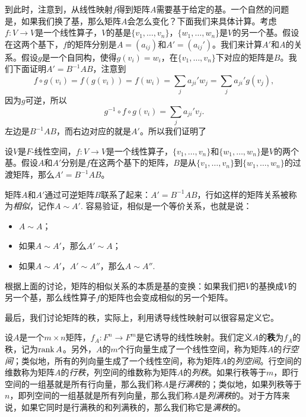 到此时，注意到，从线性映射$f$得到矩阵$A$需要基于给定的基。一个自然的问题是，如果我们换了基，那么矩阵$A$会怎么变化？下面我们来具体计算。考虑$f:V\to V$是一个线性算子，$V$的基是$\{v_1,\dots,v_n\}$，$\{w_1,\dots,w_n\}$是$V$的另一个基。假设在这两个基下，$f$的矩阵分别是$A=(a_{ij})$和$A'=(a_{ij}')$。我们来计算$A'$和$A$的关系。假设$g$是一个自同构，使得$g(v_i)=w_i$，在$\{v_1,\dots,v_n\}$下对应的矩阵是$B$。我们下面证明$A'=B^{-1}AB$，注意到
\[f\circ g(v_i)=f(g(v_i))=f(w_i)=\sum_{j}a_{ji}'w_j=\sum_{j}a_{ji}'g(v_j),\]
因为$g$可逆，所以
\[g^{-1}\circ f\circ g(v_i)=\sum_{j}a_{ji}'v_j.\]
左边是$B^{-1}AB$，而右边对应的就是$A'$。所以我们证明了

\begin{theorem}\label{thm:base-change}
    设$V$是$F$-线性空间，$f:V\to V$是一个线性算子，$\{v_1,\dots,v_n\}$和$\{w_1,\dots,w_n\}$是$V$的两个基。假设$A$和$A'$分别是$f$在这两个基下的矩阵，$B$是从$\{v_1,\dots,v_n\}$到$\{w_1,\dots,w_n\}$的过渡矩阵，那么$A'=B^{-1}AB$。
\end{theorem}

矩阵$A$和$A'$通过可逆矩阵$B$联系了起来：$A'=B^{-1}AB$，行如这样的矩阵关系被称为\emph{相似}，记作$A\sim A'$. 容易验证，相似是一个等价关系，也就是说：
\begin{itemize}
    \item $A\sim A$；
    \item 如果$A\sim A'$，那么$A'\sim A$；
    \item 如果$A\sim A'$，$A'\sim A''$，那么$A\sim A''$.
\end{itemize}
根据上面的讨论，矩阵的相似关系的本质是基的变换：如果我们把$V$的基换成$V$的另一个基，那么线性算子$f$的矩阵也会变成相似的另一个矩阵。

最后，我们讨论矩阵的秩，实际上，利用诱导线性映射可以很容易定义它。

\begin{definition}[矩阵的秩]
    设$A$是一个$m\times n$矩阵，$f_A:F^n\to F^m$是它诱导的线性映射。我们定义$A$的\textbf{秩}为$f_A$的秩，记为$\operatorname*{rank} A$。另外，$A$的$m$个行向量生成了一个线性空间，称为矩阵$A$的\emph{行空间}；类似地，所有的列向量生成了一个线性空间，称为矩阵$A$的\emph{列空间}。行空间的维数称为矩阵$A$的\emph{行秩}，列空间的维数称为矩阵$A$的\emph{列秩}。如果行秩等于$m$，即行空间的一组基就是所有行向量，那么我们称$A$是\emph{行满秩}的；类似地，如果列秩等于$n$，即列空间的一组基就是所有列向量，那么我们称$A$是\emph{列满秩}的。对于方阵来说，如果它同时是行满秩的和列满秩的，那么我们称它是\emph{满秩}的。
\end{definition}

